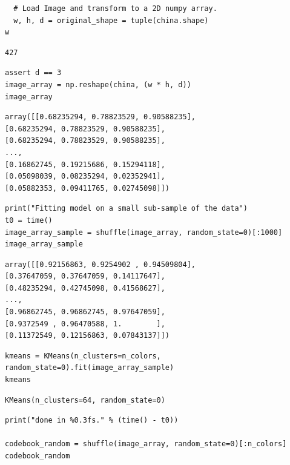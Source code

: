 \documentclass[11pt]{article}
\begin{document}
\begin{verbatim}
  # Load Image and transform to a 2D numpy array.
  w, h, d = original_shape = tuple(china.shape)
w
\end{verbatim}

\begin{verbatim}
427
\end{verbatim}

\begin{verbatim}
assert d == 3
image_array = np.reshape(china, (w * h, d))
image_array
\end{verbatim}

\begin{verbatim}
array([[0.68235294, 0.78823529, 0.90588235],
[0.68235294, 0.78823529, 0.90588235],
[0.68235294, 0.78823529, 0.90588235],
...,
[0.16862745, 0.19215686, 0.15294118],
[0.05098039, 0.08235294, 0.02352941],
[0.05882353, 0.09411765, 0.02745098]])
\end{verbatim}

\begin{verbatim}
print("Fitting model on a small sub-sample of the data")
t0 = time()
image_array_sample = shuffle(image_array, random_state=0)[:1000]
image_array_sample
\end{verbatim}

\begin{verbatim}
array([[0.92156863, 0.9254902 , 0.94509804],
[0.37647059, 0.37647059, 0.14117647],
[0.48235294, 0.42745098, 0.41568627],
...,
[0.96862745, 0.96862745, 0.97647059],
[0.9372549 , 0.96470588, 1.        ],
[0.11372549, 0.12156863, 0.07843137]])
\end{verbatim}

\begin{verbatim}
kmeans = KMeans(n_clusters=n_colors, random_state=0).fit(image_array_sample)
kmeans
\end{verbatim}

\begin{verbatim}
KMeans(n_clusters=64, random_state=0)
\end{verbatim}

\begin{verbatim}
print("done in %0.3fs." % (time() - t0))

codebook_random = shuffle(image_array, random_state=0)[:n_colors]
codebook_random
\end{verbatim}
\end{document}
